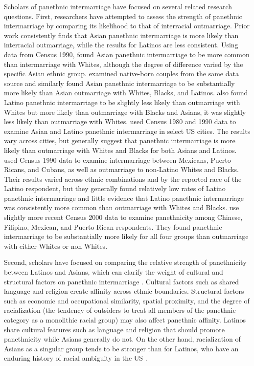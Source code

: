 \documentclass[11pt,]{article}
\begin{document}
Scholars of panethnic intermarriage have focused on several related research questions. First, researchers have attempted to assess the strength of panethnic intermarriage by comparing its likelihood to that of interracial outmarriage. Prior work consistently finds that Asian panethnic intermarriage is more likely than interracial outmarriage, while the results for Latinos are less consistent. Using data from Census 1990, \citet{qian_asian_2001} found Asian panethnic intermarriage to be more common than intermarriage with Whites, although the degree of difference varied by the specific Asian ethnic group. \citet{fu_how_2007a} examined native-born couples from the same data source and similarly found Asian panethnic intermarriage to be substantially more likely than Asian outmarriage with Whites, Blacks, and Latinos. \citet{fu_how_2007a} also found Latino panethnic intermarriage to be slightly less likely than outmarriage with Whites but more likely than outmarriage with Blacks and Asians, it was slightly less likely than outmarriage with Whites. \citet{rosenfeld_salience_2001} used Census 1980 and 1990 data to examine Asian and Latino panethnic intermarriage in select US cities. The results vary across cities, but generally suggest that panethnic intermarriage is more likely than outmarriage with Whites and Blacks for both Asians and Latinos. \citet{qian_latinos_2004} used Census 1990 data to examine intermarriage between Mexicans, Puerto Ricans, and Cubans, as well as outmarriage to non-Latino Whites and Blacks. Their results varied across ethnic combinations and by the reported race of the Latino respondent, but they generally found relatively low rates of Latino panethnic intermarriage and little evidence that Latino panethnic intermarriage was consistently more common than outmarriage with Whites and Blacks. \citet{qian_crossing_2012} use slightly more recent Census 2000 data to examine panethnicity among Chinese, Filipino, Mexican, and Puerto Rican respondents. They found panethnic intermarriage to be substantially more likely for all four groups than outmarriage with either Whites or non-Whites.

Second, scholars have focused on comparing the relative strength of panethnicity between Latinos and Asians, which can clarify the weight of cultural and structural factors on panethnic intermarriage \citep{lopez_panethnicity_1990}. Cultural factors such as shared language and religion create affinity across ethnic boundaries. Structural factors such as economic and occupational similarity, spatial proximity, and the degree of racialization (the tendency of outsiders to treat all members of the panethnic category as a monolithic racial group) may also affect panethnic affinity. Latinos share cultural features such as language and religion that should promote panethnicity while Asians generally do not. On the other hand, racialization of Asians as a singular group tends to be stronger than for Latinos, who have an enduring history of racial ambiguity in the US \citep{lopez_panethnicity_1990, rodriguez_changing_2000a, fox_defining_2013}.
\end{document}
